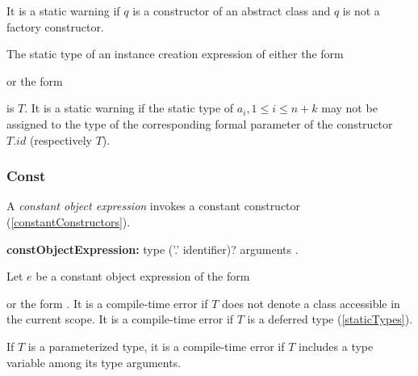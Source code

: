 \documentclass{article}
\begin{document}
\LMHash{}
It is a static warning if $q$ is a constructor of an abstract class and $q$ is not a factory constructor.



\LMHash{}
The static type of an instance creation expression of either the form


or the form


is $T$.
It is a static warning if the static type of $a_i, 1 \le i \le n + k$ may not be assigned to the type of the corresponding formal parameter of the constructor $T.id$ (respectively $T$).


\subsubsection{Const}

\LMHash{}
A {\em constant object expression} invokes a constant constructor (\ref{constantConstructors}).

\begin{grammar}
{\bf constObjectExpression:}\CONST{} type ('{\escapegrammar .}' identifier)? arguments
  .
\end{grammar}

\LMHash{}
Let $e$ be a constant object expression of the form


or the form
.
It is a compile-time error if $T$ does not denote a class accessible in the current scope.
It is a compile-time error if $T$ is a deferred type (\ref{staticTypes}).


\LMHash{}
If $T$ is a parameterized type, it is a compile-time error if $T$ includes a type variable among its type arguments.
\end{document}
